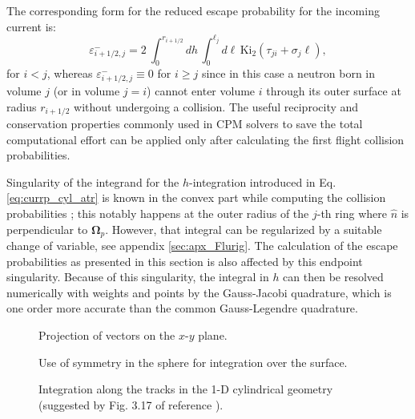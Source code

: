 \documentclass{ictt26}
\begin{document}
The corresponding form for the reduced escape probability for the incoming current is:
\begin{equation}
\label{eq:esc_prob_cyij-}
  \varepsilon^-_{i+1/2,j} = 2
    \displaystyle ~\int_0^{r_{i+1/2}} { dh\, %
        \int_0^{\ell_j}{
            d\ell \, \text{Ki}_2 \left(\tau_{ji} + \sigma_j \ell \right)
        }
	},
\end{equation}
for $i < j$, whereas $\varepsilon^-_{i+1/2,j}\equiv 0$ for $i\geq j$ since in this case a neutron born in volume $j$ (or in volume $j=i$) cannot enter volume $i$ through its outer surface at radius $r_{i+1/2}$ without undergoing a collision. The useful reciprocity and conservation properties commonly used in CPM solvers to save the total computational effort can be applied only after calculating the first flight collision probabilities.

Singularity of the integrand for the $h$-integration introduced in Eq. \ref{eq:currp_cyl_atr} is known in the convex part while computing the collision probabilities \cite{hebert2009applied,stamm1983methods}; this notably happens at the outer radius of the $j$-th ring where $\hat{n}$ is perpendicular to $\mathbf{\Omega}_p$. However, that integral can be regularized by a suitable change of variable, see appendix \ref{sec:apx_Flurig}. The calculation of the escape probabilities as presented in this section is %
also affected by this endpoint singularity. Because of this singularity, the integral in $h$ can then be resolved numerically with weights and points by the Gauss-Jacobi quadrature, which is one order more accurate than the common Gauss-Legendre quadrature.

\begin{figure}[htbp]
  \centering
  \begin{minipage}[c]{.5\textwidth}
    \centering
    {%
    
    \caption{Projection of vectors on the $x$-$y$ plane.}
    \label{fig:fullframe}
    }%
    \vspace{3mm}
    \vfill
    {%
    
    \caption{Use of symmetry in the sphere for integration over the surface.}
    \label{fig:sphere_tracks}
    }%
\end{minipage}%
\begin{minipage}{.5\textwidth}
  \centering
    
    \caption{Integration along the tracks in the 1-D cylindrical geometry (suggested by Fig. 3.17 of reference \cite{hebert2009applied}).}
    \label{fig:cyltracks}
\end{minipage}%
\end{figure}
\end{document}
